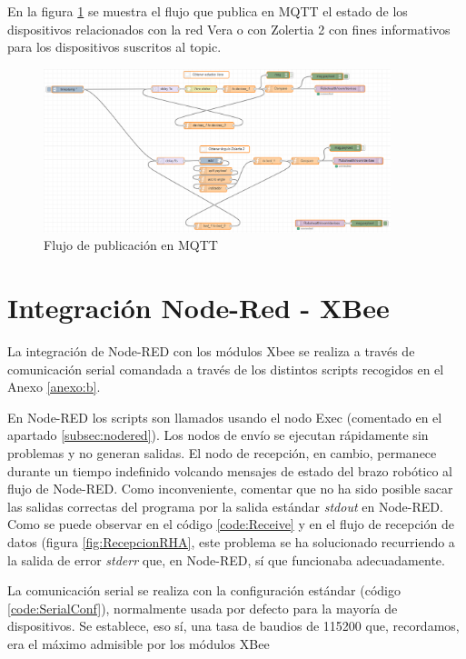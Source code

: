 En la figura \ref{fig:MQTTFlowP} se muestra el flujo que publica en MQTT el estado de los dispositivos relacionados con la red Vera o con Zolertia 2 con fines informativos para los dispositivos suscritos al topic. 

\begin{figure}[hbt]
\centering
\includegraphics[width=0.9\textwidth]{figuras/MQTTFlowP.png}
\caption{Flujo de publicación en  MQTT}
\label{fig:MQTTFlowP}
\end{figure}

\section{Integración Node-Red - XBee}\label{subsec:NR-Xbee}

La integración de Node-RED con los módulos Xbee se realiza a través de comunicación serial comandada a través de los distintos scripts recogidos en el Anexo \ref{anexo:b}.

En Node-RED los scripts son llamados usando el nodo Exec (comentado en el apartado \ref{subsec:nodered}). Los nodos de envío se ejecutan rápidamente sin problemas y no generan salidas. El nodo de recepción, en cambio, permanece durante un tiempo indefinido volcando mensajes de estado del brazo robótico al flujo de Node-RED. Como inconveniente, comentar que no ha sido posible sacar las salidas correctas del programa por la salida estándar \textit{stdout} en Node-RED. Como se puede observar en el código \ref{code:Receive} y en el flujo de recepción de datos (figura \ref{fig:RecepcionRHA}, este problema se ha solucionado recurriendo a la salida de error \textit{stderr} que, en Node-RED, sí que funcionaba adecuadamente.

La comunicación serial se realiza con la configuración estándar (código \ref{code:SerialConf}), normalmente usada por defecto para la mayoría de dispositivos. Se establece, eso sí, una tasa de baudios de 115200 que, recordamos, era el máximo admisible por los módulos XBee

